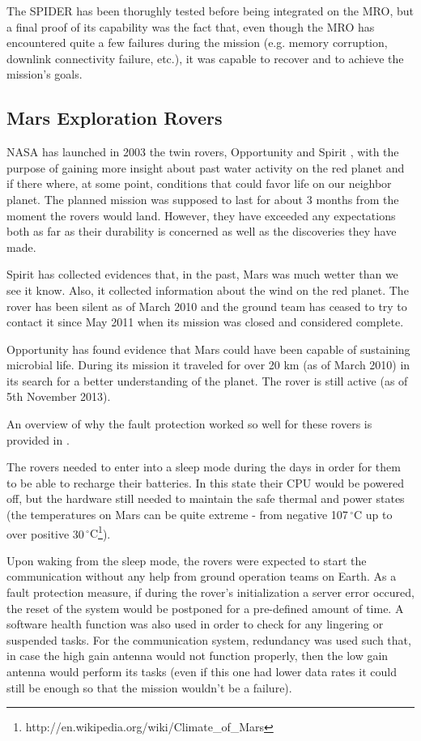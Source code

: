 The SPIDER has been thorughly tested before being integrated on the MRO, but a
final proof of its capability was the fact that, even though the MRO has
encountered quite a few failures during the mission (e.g. memory corruption,
downlink connectivity failure, etc.), it was capable to recover and to achieve
the mission's goals.

\subsection{Mars Exploration Rovers}

NASA has launched in 2003 the twin rovers, Opportunity and Spirit
\cite{mer-nasa}, with the purpose of gaining more insight about past water
activity on the red planet and if there where, at some point, conditions that
could favor life on our neighbor planet. The planned mission was supposed to
last for about 3 months from the moment the rovers would land. However, they
have exceeded any expectations both as far as their durability is concerned as
well as the discoveries they have made.

Spirit has collected evidences that, in the past, Mars was much wetter than we
see it know. Also, it collected information about the wind on the red planet.
The rover has been silent as of March 2010 and the ground team has ceased to try
to contact it since May 2011 when its mission was closed and considered
complete.

Opportunity has found evidence that Mars could have been capable of sustaining
microbial life. During its mission it traveled for over 20 km (as of March 2010)
in its search for a better understanding of the planet. The rover is still
active (as of 5th November 2013).

An overview of why the fault protection worked so well for these rovers is
provided in \cite{surv-nasa-mars}.

The rovers needed to enter into a sleep mode during the days in order for them
to be able to recharge their batteries. In this state their CPU would be powered
off, but the hardware still needed to maintain the safe thermal and power states
(the temperatures on Mars can be quite extreme - from negative
107$\,^{\circ}\mathrm{C}$ up to over positive
30$\,^{\circ}\mathrm{C}$\footnote{http://en.wikipedia.org/wiki/Climate\_of\_Mars}).

Upon waking from the sleep mode, the rovers were expected to start the
communication without any help from ground operation teams on Earth. As a fault
protection measure, if during the rover's initialization a server error occured,
the reset of the system would be postponed for a pre-defined amount of time. A
software health function was also used in order to check for any lingering or
suspended tasks. For the communication system, redundancy was used such that, in
case the high gain antenna would not function properly, then the low gain
antenna would perform its tasks (even if this one had lower data rates it could
still be enough so that the mission wouldn't be a failure).

